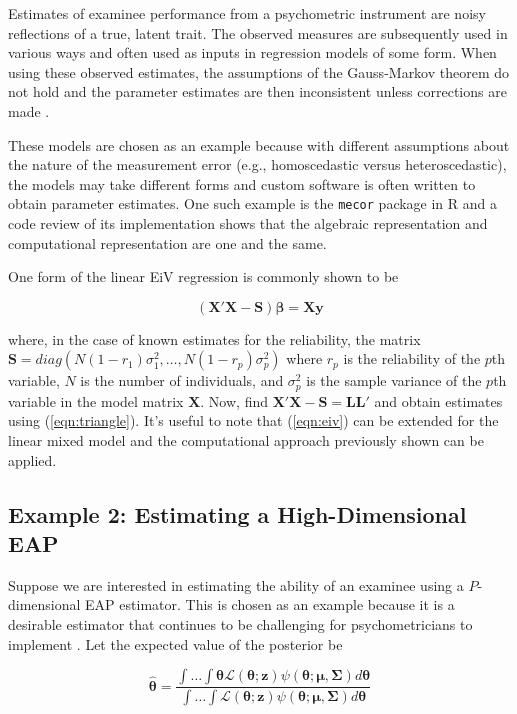 \documentclass[12pt]{article}
\begin{document}
Estimates of examinee performance from a psychometric instrument are noisy reflections of a true, latent trait. The observed measures are subsequently used in various ways and often used as inputs in regression models of some form. When using these observed estimates, the assumptions of the Gauss-Markov theorem do not hold and the parameter estimates are then inconsistent unless corrections are made \cite{doran:eiv,lockwood:eiv,nab}.   

These models are chosen as an example because with different assumptions about the nature of the measurement error (e.g., homoscedastic versus heteroscedastic), the models may take different forms and custom software is often written to obtain parameter estimates. One such example is the \texttt{mecor} \cite{nab} package in R and a code review of its implementation shows that the algebraic representation and computational representation are one and the same. 

One form of the linear EiV regression is commonly shown to be \cite{stata:eiv}

\begin{equation}
\label{eqn:eiv}
(\bm{X}'\bm{X} - \bm{S})\bm{\beta} = \bm{X}\bm{y} 
\end{equation}

\noindent where, in the case of known estimates for the reliability, the matrix $\bm{S} = diag(N(1-r_1)\sigma^2_1, \ldots, N(1-r_p)\sigma^2_p) $ where $r_p$ is the reliability of the $p$th variable, $N$ is the number of individuals, and $\sigma^2_p$ is the sample variance of the $p$th variable in the model matrix $\bm{X}$.  Now, find $\bm{X}'\bm{X} - \bm{S} = \bm{L}\bm{L}'$ and obtain estimates using (\ref{eqn:triangle}). It's useful to note that (\ref{eqn:eiv}) can be extended for the linear mixed model and the computational approach previously shown can be applied. 

\subsection*{Example 2: Estimating a High-Dimensional EAP}

Suppose we are interested in estimating the ability of an examinee using a $P$-dimensional EAP estimator. This is chosen as an example because it is a desirable estimator that continues to be challenging for psychometricians to implement \cite{Chalmers,ferrando}. Let the expected value of the posterior be 

\begin{equation}
\label{eqn:scoreIntegral}
\widehat{\boldsymbol{\theta}} = \frac{\int \dots \int \boldsymbol{\theta} \mathcal{L}(\boldsymbol{\theta};\boldsymbol{z}) \psi(\boldsymbol{\theta};\boldsymbol{\mu},\boldsymbol{\Sigma})d\boldsymbol{\theta}}{\int \dots \int \mathcal{L}(\boldsymbol{\theta};\boldsymbol{z})\psi(\boldsymbol{\theta};\boldsymbol{\mu},\boldsymbol{\Sigma})d\boldsymbol{\theta}}
\end{equation}
\end{document}
